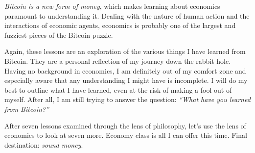 \textit{Bitcoin is a new form of money}, which makes learning about
economics paramount to understanding it. Dealing with the nature of human action
and the interactions of economic agents, economics is probably one of the
largest and fuzziest pieces of the Bitcoin puzzle.

Again, these lessons are an exploration of the various things I have learned
from Bitcoin. They are a personal reflection of my journey down the rabbit hole.
Having no background in economics, I am definitely out of my comfort zone and
especially aware that any understanding I might have is incomplete. I will do my
best to outline what I have learned, even at the risk of making a fool out of
myself. After all, I am still trying to answer the question:
\textit{\enquote{What have you learned from Bitcoin?}}

After seven lessons examined through the lens of philosophy, let’s use the lens
of economics to look at seven more. Economy class is all I can offer this time.
Final destination: \textit{sound money}.

